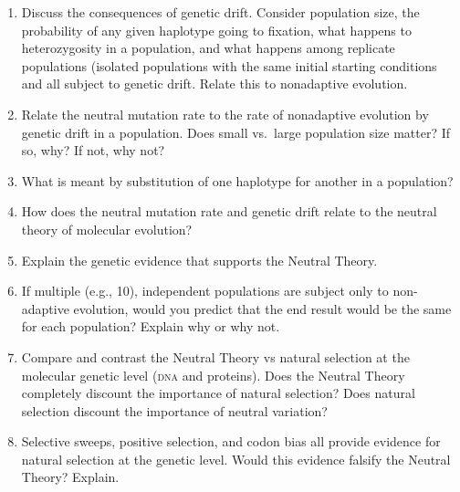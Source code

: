 \documentclass[letterpaper]{tufte-handout}
\begin{document}
\begin{enumerate}
	
	\item Discuss the consequences of genetic drift. Consider population size, the probability of any given haplotype going to fixation, what happens to heterozygosity in a population, and what happens among replicate populations (isolated populations with the same initial starting conditions and all subject to genetic drift.  Relate this to nonadaptive evolution.  

	\item Relate the neutral mutation rate to the rate of nonadaptive evolution by genetic drift in a population.  Does small vs.~large population size matter? If so, why?  If not, why not?

	\item What is meant by substitution of one haplotype for another in a population? 

	\item How does the neutral mutation rate and genetic drift relate to the neutral theory of molecular evolution?

	\item Explain the genetic evidence that supports the Neutral Theory.

	\item If multiple (e.g., 10), independent populations are subject only to non-adaptive evolution, would you predict that the end result would be the same for each population? Explain why or why not.
	
	\item Compare and contrast the Neutral Theory vs natural selection at the molecular genetic level ({\scshape dna} and proteins).  Does the Neutral Theory completely discount the importance of natural selection?  Does natural selection discount the importance of neutral variation?

	\item Selective sweeps, positive selection, and codon bias all provide evidence for natural selection at the genetic level. Would this evidence falsify the Neutral Theory?  Explain. 

\end{enumerate}
\end{document}
